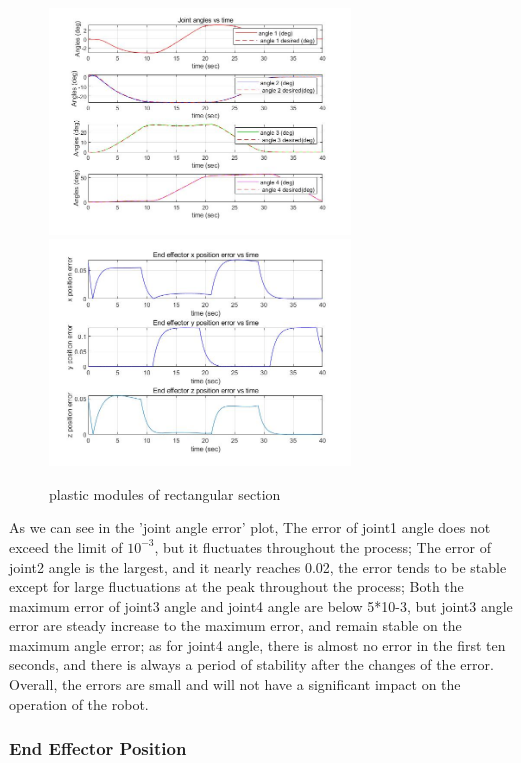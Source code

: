 \begin{figure}[htbp]
    \centering
    \includegraphics[width=8cm]{./fig/4.jpg}
    \includegraphics[width=8cm]{./fig/6.jpg}
    \caption{plastic modules of rectangular section}
    \label{f1}
\end{figure}

As we can see in the 'joint angle error' plot, 
The error of joint1 angle does not exceed the limit of $10^{-3}$, but it fluctuates throughout the process;
The error of joint2 angle is the largest, and it nearly reaches 0.02, the error tends to be stable except for large fluctuations at the peak throughout the process;
Both the maximum error of joint3 angle and joint4 angle are below 5*10-3, but joint3 angle error are steady increase to the maximum error, and remain stable on the maximum angle error; as for joint4 angle, there is almost no error in the first ten seconds, and there is always a period of stability after the changes of the error.
Overall, the errors are small and will not have a significant impact on the operation of the robot.




\subsubsection*{End Effector Position}


